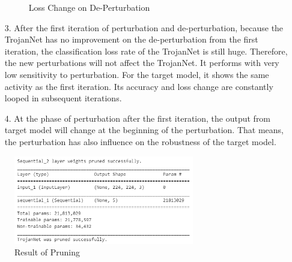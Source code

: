 \documentclass[english,version-2022-01]{uzl-thesis}
\begin{document}
\begin{itemize}
\begin{figure}[htpb]
          \caption{Loss Change on De-Perturbation}
          \label{Sensitivity}
    \end{figure} 
    \item[3.] After the first iteration of perturbation and de-perturbation, because the TrojanNet has no improvement on the de-perturbation from the first iteration, the classification loss rate of the TrojanNet is still huge. Therefore, the new perturbations will not affect the TrojanNet. It performs with very low sensitivity to perturbation. For the target model, it shows the same activity as the first iteration. Its accuracy and loss change are constantly looped in subsequent iterations.
    \item[4.] At the phase of perturbation after the first iteration, the output from target model will change at the beginning of the perturbation. That means, the perturbation has also influence on the robustness of the target model.
\end{itemize}
\begin{figure}[htpb]
  \centering
  \includegraphics[width=0.7\textwidth]{pic/pruning.png}
  \caption{Result of Pruning}
  \label{result of pruning}
\end{figure}
\end{document}
